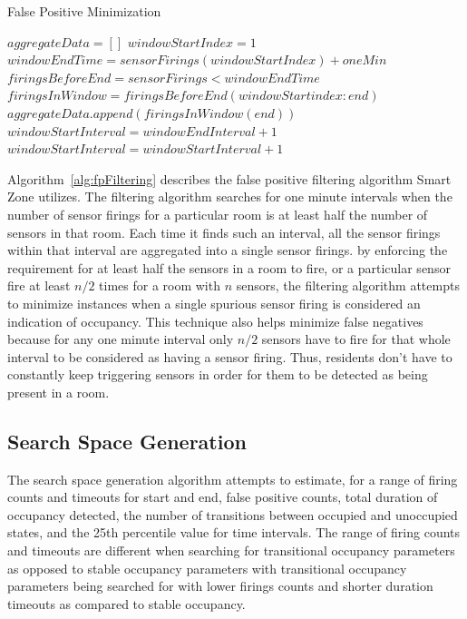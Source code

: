 \begin{algorithm}                      %
\caption{False Positive Minimization}          %
\label{alg:fpFiltering}                           %
\begin{algorithmic}                    %
\STATE $aggregateData = []$
\STATE $windowStartIndex = 1$
\STATE $windowEndTime = sensorFirings(windowStartIndex) + oneMin$
\STATE $firingsBeforeEnd = sensorFirings < windowEndTime$
\STATE $firingsInWindow = firingsBeforeEnd(windowStartindex:end)$
\STATE $aggregateData.append(firingsInWindow(end))$
\STATE $windowStartInterval = windowEndInterval + 1$
\ELSE
\STATE $windowStartInterval = windowStartInterval + 1$
\ENDIF
\ENDWHILE
\end{algorithmic}
\end{algorithm}

Algorithm~\ref{alg:fpFiltering} describes the false positive filtering algorithm
Smart Zone utilizes. The filtering algorithm searches for one minute intervals
when the number of sensor firings for a particular room is at least half the
number of sensors in that room. Each time it finds such an interval, all the
sensor firings within that interval are aggregated into a single sensor
firings. by enforcing the requirement for at least half the sensors in a room to
fire, or a particular sensor fire at least $n/2$ times for a room with $n$
sensors, the filtering algorithm attempts to minimize instances when a single
spurious sensor firing is considered an indication of occupancy. This technique
also helps minimize false negatives because for any one minute interval only
$n/2$ sensors have to fire for that whole interval to be considered as having
a sensor firing. Thus, residents don't have to constantly keep triggering
sensors in order for them to be detected as being present in a room.

\subsection{Search Space Generation}
The search space generation algorithm attempts to estimate, for a range of
firing counts and timeouts for start and end, false positive counts, total
duration of occupancy detected, the number of transitions between occupied and
unoccupied states, and the 25th percentile value for time intervals. The range
of firing counts and timeouts are different when searching for transitional
occupancy parameters as opposed to stable occupancy parameters with transitional
occupancy parameters being searched for with lower firings counts and shorter
duration timeouts as compared to stable occupancy.

